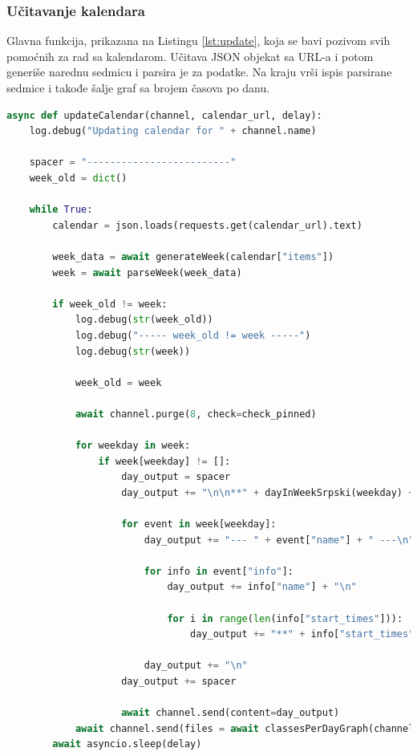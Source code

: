 \documentclass[a4paper,11pt]{article}
\begin{document}
\subsubsection{Učitavanje kalendara}
Glavna funkcija, prikazana na Listingu \ref{lst:update}, koja se bavi pozivom svih pomoćnih za rad sa kalendarom. Učitava JSON objekat sa URL-a i potom generiše narednu sedmicu i parsira je za podatke. Na kraju vrši ispis parsirane sedmice i takođe šalje graf sa brojem časova po danu.
\begin{lstlisting}[language=Python, caption=Učitavanje kalendara, label=lst:update]
async def updateCalendar(channel, calendar_url, delay):
    log.debug("Updating calendar for " + channel.name)

    spacer = "-------------------------"
    week_old = dict()

    while True:
        calendar = json.loads(requests.get(calendar_url).text)

        week_data = await generateWeek(calendar["items"])
        week = await parseWeek(week_data)

        if week_old != week:
            log.debug(str(week_old))
            log.debug("----- week_old != week -----")
            log.debug(str(week))

            week_old = week

            await channel.purge(8, check=check_pinned)

            for weekday in week:
                if week[weekday] != []:
                    day_output = spacer
                    day_output += "\n\n**" + dayInWeekSrpski(weekday) + ":**\n\n"

                    for event in week[weekday]:
                        day_output += "--- " + event["name"] + " ---\n"

                        for info in event["info"]:
                            day_output += info["name"] + "\n"

                            for i in range(len(info["start_times"])):
                                day_output += "**" + info["start_times"][i] + "** - " + info["end_times"][i] + "\n"

                        day_output += "\n"
                    day_output += spacer

                    await channel.send(content=day_output)
            await channel.send(files = await classesPerDayGraph(channel.name, week))
        await asyncio.sleep(delay)
\end{lstlisting}
\newpage
\end{document}
